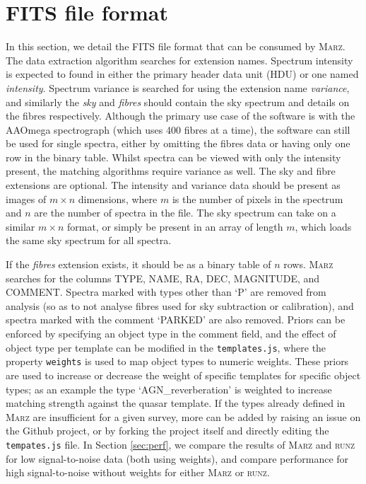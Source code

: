 \documentclass[5p]{elsarticle}
\newcommand{\runz}{\textsc{runz}}
\newcommand{\marz}{\textsc{Marz}}
\begin{document}
\section{FITS file format} \label{sec:format}

In this section, we detail the FITS file format that can be consumed by \marz{}. The data extraction algorithm searches for extension names. Spectrum intensity is expected to found in either the primary header data unit (HDU) or one named \textit{intensity}. Spectrum variance is searched for using the extension name \textit{variance}, and similarly the \textit{sky} and \textit{fibres} should contain the sky spectrum and details on the fibres respectively. Although the primary use case of the software is with the AAOmega spectrograph (which uses 400 fibres at a time), the software can still be used for single spectra, either by omitting the fibres data or having only one row in the binary table. Whilst spectra can be viewed with only the intensity present, the matching algorithms require variance as well. The sky and fibre extensions are optional. The intensity and variance data should be present as images of $m\times n$ dimensions, where $m$ is the number of pixels in the spectrum and $n$ are the number of spectra in the file. The sky spectrum can take on a similar $m\times n$ format, or simply be present in an array of length $m$, which loads the same sky spectrum for all spectra.

If the \textit{fibres} extension exists, it should be as a binary table of $n$ rows. \marz{} searches for the columns TYPE, NAME, RA, DEC, MAGNITUDE, and COMMENT. Spectra marked with types other than `P' are removed from analysis (so as to not analyse fibres used for sky subtraction or calibration), and spectra marked with the comment `PARKED' are also removed. Priors can be enforced by specifying an object type in the comment field, and the effect of object type per template can be modified in the \verb;templates.js;, where the property \verb;weights; is used to map object types to numeric weights. These priors are used to increase or decrease the weight of specific templates for specific object types; as an example the type `AGN\_reverberation' is weighted to increase matching strength against the quasar template. If the types already defined in \marz{} are insufficient for a given survey, more can be added by raising an issue on the Github project, or by forking the project itself and directly editing the \verb;tempates.js; file. In Section \ref{sec:perf}, we compare the results of \marz{} and \runz{} for low signal-to-noise data (both using weights), and compare performance for high signal-to-noise without weights for either \marz{} or \runz{}.
\end{document}
